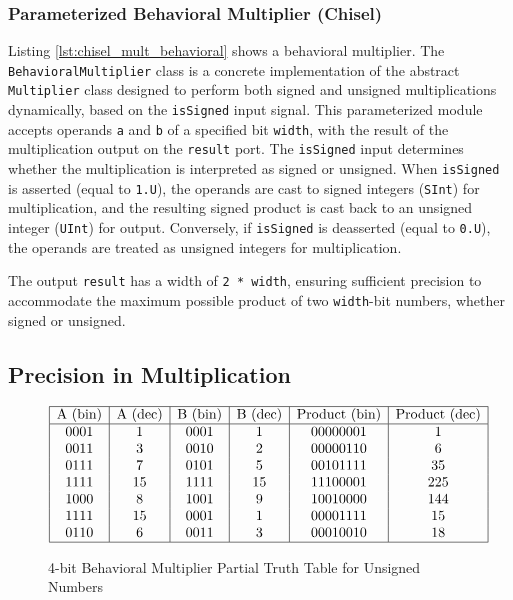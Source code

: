 {%
\subsubsection{Parameterized Behavioral Multiplier (Chisel)}

Listing \ref{lst:chisel_mult_behavioral} shows a behavioral multiplier. The \texttt{BehavioralMultiplier} class is a concrete implementation of the abstract \texttt{Multiplier} class designed to perform both signed and unsigned multiplications dynamically, based on the \texttt{isSigned} input signal. This parameterized module accepts operands \texttt{a} and \texttt{b} of a specified bit \texttt{width}, with the result of the multiplication output on the \texttt{result} port. The \texttt{isSigned} input determines whether the multiplication is interpreted as signed or unsigned. When \texttt{isSigned} is asserted (equal to \texttt{1.U}), the operands are cast to signed integers (\texttt{SInt}) for multiplication, and the resulting signed product is cast back to an unsigned integer (\texttt{UInt}) for output. Conversely, if \texttt{isSigned} is deasserted (equal to \texttt{0.U}), the operands are treated as unsigned integers for multiplication.

The output \texttt{result} has a width of \texttt{2 * width}, ensuring sufficient precision to accommodate the maximum possible product of two \texttt{width}-bit numbers, whether signed or unsigned. 

}%

\subsection{Precision in Multiplication}

\begin{figure}[H]
    \centering
\[
\begin{array}{|c|c|c|c|c|c|}
\hline
\text{A (bin)} & \text{A (dec)} & \text{B (bin)} & \text{B (dec)} & \text{Product (bin)} & \text{Product (dec)} \\
\hline
0001 & 1 & 0001 & 1 & 00000001 & 1 \\
0011 & 3 & 0010 & 2 & 00000110 & 6 \\
0111 & 7 & 0101 & 5 & 00101111 & 35 \\
1111 & 15 & 1111 & 15 & 11100001 & 225 \\
1000 & 8 & 1001 & 9 & 10010000 & 144 \\
1111 & 15 & 0001 & 1 & 00001111 & 15 \\
0110 & 6 & 0011 & 3 & 00010010 & 18 \\
\hline
\end{array}
\]
    \caption{4-bit Behavioral Multiplier Partial Truth Table for Unsigned Numbers}
    \label{fig:4bit_multiplier_tt_unsigned}
\end{figure}

